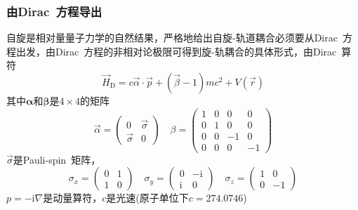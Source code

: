 \documentclass[cjk,slidestop,compress,mathserif,blue]{beamer}
\begin{document}
\frame
{
	\frametitle{由\textrm{Dirac~}方程导出}
	自旋是相对量量子力学的自然结果，严格地给出自旋-轨道耦合必须要从\textrm{Dirac~}方程出发，由\textrm{Dirac~}方程的非相对论极限可得到旋-轨耦合的具体形式，由\textrm{Dirac~}算符
	\begin{displaymath}
		\vec H_{\mathrm D}=c\vec{\alpha}\cdot\vec p+(\vec{\beta}-1)mc^2+V(\vec r)
	\end{displaymath}
	其中$\mathbf{\alpha}$和$\mathbf{\beta}$是$4\times4$的矩阵
	\begin{displaymath}
		\vec{\alpha}=\left(
		\begin{matrix}
			0 &\vec{\sigma}\\
			\vec{\sigma} &0
		\end{matrix}
		\right)\quad\beta=\left(
		\begin{matrix}
			1 &0 &0 &0\\
			0 &1 &0 &0\\
			0 &0 &-1 &0\\
			0 &0 &0 &-1
		\end{matrix}
		\right)
	\end{displaymath}
	$\vec{\sigma}$是\textrm{Pauli-spin~}矩阵，
	\begin{displaymath}
		\sigma_x=\left( 
		\begin{matrix}
			0 &1\\
			1 &0
		\end{matrix}
		\right)\quad
		\sigma_y=\left( 
		\begin{matrix}
			0 &-\mathrm{i}\\
			\mathrm{i} &0
		\end{matrix}
		\right)\quad
		\sigma_z=\left( 
		\begin{matrix}
			1 &0\\
			0 &-1
		\end{matrix}
		\right)
	\end{displaymath}
	$p=-\mathrm{i}\nabla$是动量算符，$c$是光速(原子单位下$c=274.0746$)
}
\end{document}
